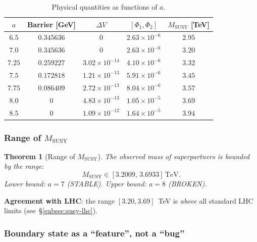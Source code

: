 \documentclass[11pt,a4paper]{article}
\newtheorem{theorem}{Theorem}[section]
\theoremstyle{definition}
\begin{document}
\begin{table}[ht]
\centering
\caption{Physical quantities as functions of \texorpdfstring{$a$}{a}.}
\label{tab:membrane-boundary-values}
\begin{tabular}{ccccc}
\toprule
$a$ & Barrier [GeV] & $\Delta V$ & $[\Phi_1, \Phi_2]$ & $M_{\text{SUSY}}$ [TeV] \\
\midrule
$6.5$  & $0.345636$ & $0$ & $2.63 \times 10^{-6}$ & $2.95$ \\
$7.0$  & $0.345636$ & $0$ & $2.63 \times 10^{-6}$ & $\mathbf{3.20}$ \\
$7.25$ & $0.259227$ & $3.02 \times 10^{-14}$ & $4.10 \times 10^{-6}$ & $3.32$ \\
$7.5$  & $0.172818$ & $1.21 \times 10^{-13}$ & $5.91 \times 10^{-6}$ & $3.45$ \\
$7.75$ & $0.086409$ & $2.72 \times 10^{-13}$ & $8.04 \times 10^{-6}$ & $3.57$ \\
$8.0$  & $0$ & $4.83 \times 10^{-13}$ & $1.05 \times 10^{-5}$ & $\mathbf{3.69}$ \\
$8.5$  & $0$ & $1.09 \times 10^{-12}$ & $1.64 \times 10^{-5}$ & $3.94$ \\
\bottomrule
\end{tabular}
\end{table}

\subsubsection{Range of \texorpdfstring{$M_{\text{SUSY}}$}{M\_SUSY}}

\begin{theorem}[Range of $M_{\text{SUSY}}$]
\label{thm:membrane-MSUSY-range}
The observed mass of superpartners is bounded by the range:
\begin{equation}
    \boxed{
    M_{\text{SUSY}} \in [3.2009, \, 3.6933] \, \text{TeV}.
    }
    \label{eq:membrane-MSUSY-range}
\end{equation}
Lower bound: $a = 7$ (STABLE).
Upper bound: $a = 8$ (BROKEN).
\end{theorem}

\medskip\noindent
\textbf{Agreement with LHC}: the range $[3.20, 3.69]$~TeV
is \emph{above} all standard LHC limits (see~\S\ref{subsec:susy-lhc}).

\subsubsection{Boundary state as a ``feature'', not a ``bug''}
\end{document}
